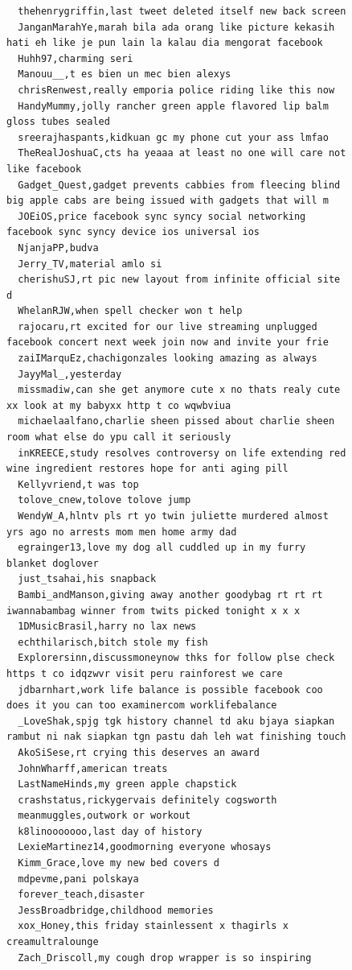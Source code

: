\begin{figure}[htpb]
\begin{verbatim}
  thehenrygriffin,last tweet deleted itself new back screen
  JanganMarahYe,marah bila ada orang like picture kekasih hati eh like je pun lain la kalau dia mengorat facebook
  Huhh97,charming seri
  Manouu__,t es bien un mec bien alexys
  chrisRenwest,really emporia police riding like this now
  HandyMummy,jolly rancher green apple flavored lip balm gloss tubes sealed
  sreerajhaspants,kidkuan gc my phone cut your ass lmfao
  TheRealJoshuaC,cts ha yeaaa at least no one will care not like facebook
  Gadget_Quest,gadget prevents cabbies from fleecing blind big apple cabs are being issued with gadgets that will m
  JOEiOS,price facebook sync syncy social networking facebook sync syncy device ios universal ios
  NjanjaPP,budva
  Jerry_TV,material amlo si
  cherishuSJ,rt pic new layout from infinite official site d
  WhelanRJW,when spell checker won t help
  rajocaru,rt excited for our live streaming unplugged facebook concert next week join now and invite your frie
  zaiIMarquEz,chachigonzales looking amazing as always
  JayyMal_,yesterday
  missmadiw,can she get anymore cute x no thats realy cute xx look at my babyxx http t co wqwbviua
  michaelaalfano,charlie sheen pissed about charlie sheen room what else do ypu call it seriously
  inKREECE,study resolves controversy on life extending red wine ingredient restores hope for anti aging pill
  Kellyvriend,t was top
  tolove_cnew,tolove tolove jump
  WendyW_A,hlntv pls rt yo twin juliette murdered almost yrs ago no arrests mom men home army dad
  egrainger13,love my dog all cuddled up in my furry blanket doglover
  just_tsahai,his snapback
  Bambi_andManson,giving away another goodybag rt rt rt iwannabambag winner from twits picked tonight x x x
  1DMusicBrasil,harry no lax news
  echthilarisch,bitch stole my fish
  Explorersinn,discussmoneynow thks for follow plse check https t co idqzwvr visit peru rainforest we care
  jdbarnhart,work life balance is possible facebook coo does it you can too examinercom worklifebalance
  _LoveShak,spjg tgk history channel td aku bjaya siapkan rambut ni nak siapkan tgn pastu dah leh wat finishing touch
  AkoSiSese,rt crying this deserves an award
  JohnWharff,american treats
  LastNameHinds,my green apple chapstick
  crashstatus,rickygervais definitely cogsworth
  meanmuggles,outwork or workout
  k8linooooooo,last day of history
  LexieMartinez14,goodmorning everyone whosays
  Kimm_Grace,love my new bed covers d
  mdpevme,pani polskaya
  forever_teach,disaster
  JessBroadbridge,childhood memories
  xox_Honey,this friday stainlessent x thagirls x creamultralounge
  Zach_Driscoll,my cough drop wrapper is so inspiring

\end{verbatim}
\end{figure}
